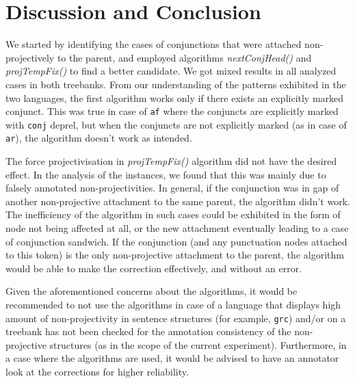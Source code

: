 \section{Discussion and Conclusion}

We started by identifying the cases of conjunctions that were attached non-projectively to the parent, and employed algorithms \textit{nextConjHead()} and \textit{projTempFix()} to find a better candidate. We got mixed results in all analyzed cases in both treebanks. From our understanding of the patterns exhibited in the two languages, the first algorithm works only if there exists an explicitly marked conjunct. This was true in case of \verb|af| where the conjuncts are explicitly marked with \verb|conj| deprel, but when the conjuncts are not explicitly marked (as in case of \verb|ar|), the algorithm doesn't work as intended. 

The force projectivisation in \textit{projTempFix()} algorithm did not have the desired effect. In the analysis of the instances, we found that this was mainly due to falsely annotated non-projectivities. In general, if the conjunction was in gap of another non-projective attachment to the same parent, the algorithm didn't work. The inefficiency of the algorithm in such cases could be exhibited in the form of node not being affected at all, or the new attachment eventually leading to a case of conjunction sandwich. If the conjunction (and any punctuation nodes attached to this token) is the only non-projective attachment to the parent, the algorithm would be able to make the correction effectively, and without an error.

Given the aforementioned concerns about the algorithms, it would be recommended to not use the algorithms in case of a language that displays high amount of non-projectivity in sentence structures (for example, \verb|grc|) and/or on a treebank has not been checked for the annotation consistency of the non-projective structures (as in the scope of the current experiment). Furthermore, in a case where the algorithms are used, it would be advised to have an annotator look at the corrections for higher reliability.

